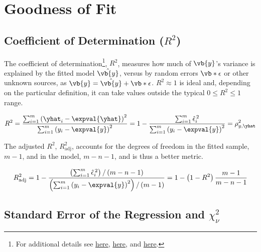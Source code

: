 \section{Goodness of Fit}
\label{regression:goodness_of_fit}

\subsection{Coefficient of Determination (\texorpdfstring{$R^{2}$}{R-Squared})}
\label{regression:goodness_of_fit:R2}

The coefficient of determination\footnote{For additional details see
\href{https://economictheoryblog.com/2014/11/05/the-coefficient-of-determination-latex-r2/}{here},
\href{https://economictheoryblog.com/2014/11/05/proof/}{here}, and
\href{http://people.duke.edu/~rnau/rsquared.htm}{here}.}, $R^{2}$,
measures how much of $\vb{y}$'s variance is explained by the fitted model $\hat{\vb{y}}$,
versus by random errors $\vb*{\epsilon}$ or other unknown sources,
as $\vb{y} = \hat{\vb{y}} + \vb*{\epsilon}$.
$R^{2} \approx 1$ is ideal and, depending on the particular definition,
it can take values outside the typical $0 \leq R^{2} \leq 1$ range.

\begin{equation}\label{eq:regression:goodness_of_fit:R2}
R^{2} = \frac{
\sum_{i=1}^{m} \left(\yhat_{i} - \expval{\yhat}\right)^{2}
}{
\sum_{i=1}^{m} \left(y_{i} - \expval{y}\right)^{2}
} = 1 - \frac{
\sum_{i=1}^{m} \hat{\epsilon}_{i}^{\,2}
}{
\sum_{i=1}^{m} \left(y_{i} - \expval{y}\right)^{2}
} = \rho_{y,\yhat}^{2}
\end{equation}

The adjusted $R^{2}$, $R^{2}_{\text{adj}}$, accounts for the degrees of freedom in the
fitted sample, $m-1$, and in the model, $m-n-1$, and is thus a better metric.

\begin{equation}\label{eq:regression:goodness_of_fit:R2_adj}
R^{2}_{\text{adj}} = 1 - \frac{
\left(\sum_{i=1}^{m} \hat{\epsilon}_{i}^{\,2}\right)/\left(m-n-1\right)
}{
\left(\sum_{i=1}^{m} \left(y_{i} - \expval{y}\right)^{2}\right)/\left(m-1\right)
}
= 1 - \left(1-R^{2}\right)\frac{m-1}{m-n-1}
\end{equation}

\subsection{Standard Error of the Regression and \texorpdfstring{$\chi_{\nu}^{2}$}{Chi-Nu}}
\label{regression:goodness_of_fit:reduced_chi2}

